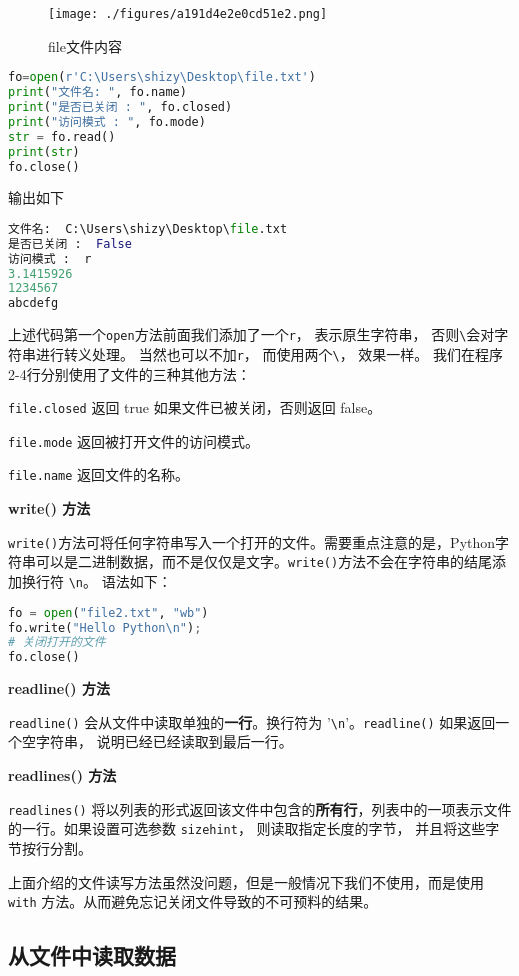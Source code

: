 \begin{figure}[ht]
\centering
\texttt{[image: ./figures/a191d4e2e0cd51e2.png]}
\caption{file文件内容} \label{fig_PyFile_1}
\end{figure}
\begin{lstlisting}[language=python]
fo=open(r'C:\Users\shizy\Desktop\file.txt')
print("文件名: ", fo.name)
print("是否已关闭 : ", fo.closed)
print("访问模式 : ", fo.mode)
str = fo.read()
print(str)
fo.close()
\end{lstlisting}
输出如下
\begin{lstlisting}[language=python]
文件名:  C:\Users\shizy\Desktop\file.txt
是否已关闭 :  False
访问模式 :  r
3.1415926
1234567
abcdefg
\end{lstlisting}
上述代码第一个\verb`open`方法前面我们添加了一个\verb`r`， 表示原生字符串， 否则\verb`\`会对字符串进行转义处理。 当然也可以不加\verb`r`， 而使用两个\verb`\`， 效果一样。 我们在程序2-4行分别使用了文件的三种其他方法：

\verb`file.closed` 返回 true 如果文件已被关闭，否则返回 false。

\verb`file.mode` 返回被打开文件的访问模式。

\verb`file.name` 返回文件的名称。


\textbf{write() 方法}

\verb`write()`方法可将任何字符串写入一个打开的文件。需要重点注意的是，Python字符串可以是二进制数据，而不是仅仅是文字。\verb`write()`方法不会在字符串的结尾添加换行符 \verb`\n`。 语法如下：
\begin{lstlisting}[language=python]
fo = open("file2.txt", "wb")
fo.write("Hello Python\n");
# 关闭打开的文件
fo.close()
\end{lstlisting}

\textbf{readline() 方法}

\verb`readline()` 会从文件中读取单独的\textbf{一行}。换行符为 '\verb`\n`'。\verb`readline()` 如果返回一个空字符串， 说明已经已经读取到最后一行。

\textbf{readlines() 方法}

\verb`readlines()` 将以列表的形式返回该文件中包含的\textbf{所有行}，列表中的一项表示文件的一行。如果设置可选参数 \verb`sizehint`， 则读取指定长度的字节， 并且将这些字节按行分割。

上面介绍的文件读写方法虽然没问题，但是一般情况下我们不使用，而是使用\verb`with` 方法。从而避免忘记关闭文件导致的不可预料的结果。


\subsection{从文件中读取数据}
